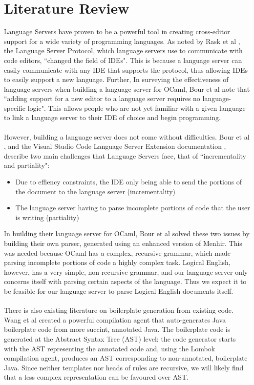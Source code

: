 \documentclass[../main.tex]{subfiles}
\begin{document}
\section*{Literature Review}

Language Servers have proven to be a powerful tool in creating cross-editor support for a wide variety of programming languages. As noted by Rask et al \cite[]{standardised_lsp_extensions}, the Language Server Protocol, which language servers use to communicate with code editors, ``changed the field of IDEs". This is because a language server can easily communicate with any IDE that supports the protocol, thus allowing IDEs to easily support a new language. Further, In surveying the effectiveness of language servers when building a language server for OCaml, Bour et al \cite[]{merlin_experience_report} note that ``adding support for a new editor to a language server requires no language-specific logic". This allows people who are not yet familiar with a given language to link a language server to their IDE of choice and begin programming. 
\\ \\
However, building a language server does not come without difficulties. Bour et al \cite[]{merlin_experience_report}, and the Visual Studio Code Language Server Extension documentation \cite[]{vsc_langserver_docs}, describe two main challenges that Language Servers face, that of ``incrementality and partiality":
\begin{itemize}
    \item Due to effiency constraints, the IDE only being able to send the portions of the document to the language server (incrementality)
    \item The language server having to parse incomplete portions of code that the user is writing (partiality)
\end{itemize}
In building their language server for OCaml, Bour et al solved these two issues by building their own parser, generated using an enhanced version of Menhir. This was needed because OCaml has a complex, recursive grammar, which made parsing incomplete portions of code a highly complex task. Logical English, however, has a very simple, non-recursive grammar, and our language server only concerns itself with parsing certain aspects of the language. Thus we expect it to be feasible for our language server to parse Logical English documents itself.
\\ \\
There is also existing literature on boilerplate generation from existing code. Wang et al \cite[]{classless_java} created a powerful compilation agent that auto-generates Java boilerplate code from more succint, annotated Java. The boilerplate code is generated at the Abstract Syntax Tree (AST) level: the code generator starts with the AST representing the annotated code and, using the Lombok compilation agent, produces an AST corresponding to non-annotated, boilerplate Java. Since neither templates nor heads of rules are recursive, we will likely find that a less complex representation can be favoured over AST.
\end{document}
